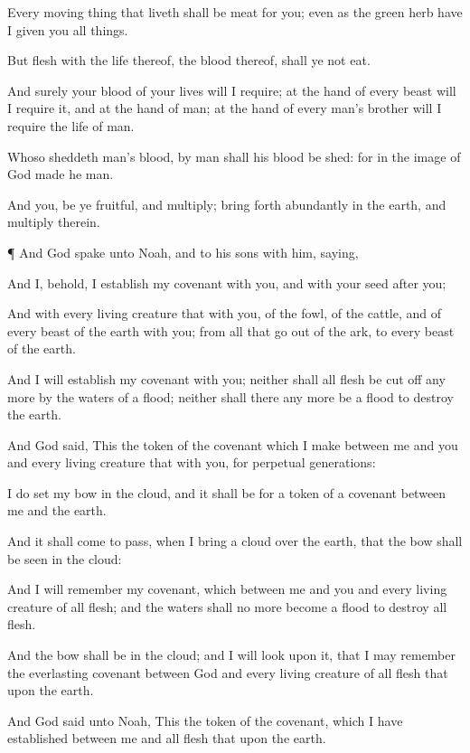 {Every moving
thing that
liveth shall be
meat for you; even as the
green
herb have I
given you all things.

But
flesh with the
life thereof,
{} the
blood thereof, shall ye not
eat.

And
surely your
blood of your
lives will I
require; at the
hand of every
beast will I require
it, and at the
hand of
man; at the
hand of every
man’s
brother will I
require the
life of
man.

Whoso
sheddeth
man’s
blood, by
man shall his
blood be
shed: for in the
image of
God
made he
man.

And you, be ye
fruitful, and
multiply; bring forth
abundantly in the
earth, and
multiply therein.


\par }{\PP {}¶ And
God
spake unto
Noah, and to his
sons with him,
saying,

And I, behold, I
establish my
covenant with you, and with your
seed after
you;

And with every
living
creature that
{} with you, of the
fowl, of the
cattle, and of every
beast of the
earth with you; from all that go
out of the
ark, to every
beast of the
earth.

And I will
establish my
covenant with you; neither shall all
flesh be cut
off any more by the
waters of a
flood; neither shall there any more be a
flood to
destroy the
earth.


\par }{\PP {}And
God
said, This
{} the
token of the
covenant which
I
make between me and you and every
living
creature that
{} with you, for
perpetual
generations:

I do
set my
bow in the
cloud, and it shall be for a
token of a
covenant between me and the
earth.

And it shall come to pass, when I
bring a
cloud over the
earth, that the
bow shall be
seen in the
cloud:

And I will
remember my
covenant, which
{} between me and you and every
living
creature of all
flesh; and the
waters shall no
more become a
flood to
destroy all
flesh.

And the
bow shall be in the
cloud; and I will look upon
it, that I may
remember the
everlasting
covenant
between
God
and every
living
creature of all
flesh that
{} upon the
earth.

And
God
said unto
Noah, This
{} the
token of the
covenant, which I have
established between me and all
flesh that
{} upon the
earth.


}
